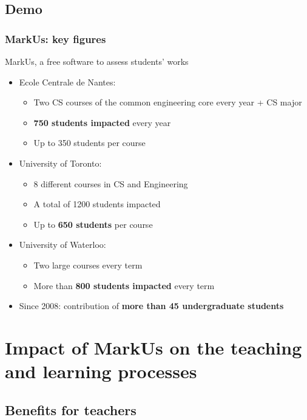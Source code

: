 \documentclass[hyperref,french,usenames,xcolor=dvipsnames]{beamer}
\begin{document}
\subsection*{Demo}


\frame
{
  \frametitle{MarkUs: key figures}

\begin{block}{MarkUs, a free software to assess students' works}
\begin{itemize}
\item Ecole Centrale de Nantes: 
\begin{itemize}
\item Two CS courses of the common engineering core every year + CS major 
\item \textbf{750 students impacted} every year
\item Up to 350 students per course
\end{itemize}
\item University of Toronto: 
\begin{itemize}
\item 8 different courses in CS and Engineering
\item A total of 1200 students impacted 
\item Up to \textbf{650 students} per course 
\end{itemize}
\item University of Waterloo: 
\begin{itemize}
\item Two large courses every term 
\item More than \textbf{800 students impacted} every term
\end{itemize}
\item Since 2008: contribution of \textbf{more than 45 undergraduate students} 
\end{itemize}
\end{block}
}

\section*{Impact of MarkUs on the teaching and learning processes}


\subsection*{Benefits for teachers}
\end{document}
